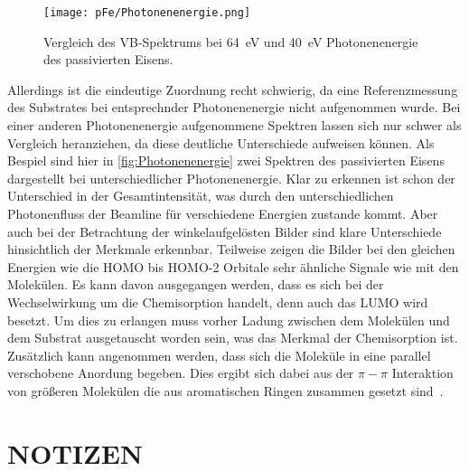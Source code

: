        \begin{figure}
            \centering
            \texttt{[image: pFe/Photonenenergie.png]}
            \caption{Vergleich des VB-Spektrums bei \SI{64}{\electronvolt} und \SI{40}{\electronvolt} Photonenenergie des passivierten Eisens.}
            \label{fig:Photonenenergie}
        \end{figure}

        Allerdings ist die eindeutige Zuordnung recht schwierig, da eine Referenzmessung des Substrates bei entsprechnder Photonenenergie nicht aufgenommen wurde.
        Bei einer anderen Photonenenergie aufgenommene Spektren lassen sich nur schwer als Vergleich heranziehen, da diese deutliche Unterschiede aufweisen können.
        Als Bespiel sind hier in \autoref{fig:Photonenenergie} zwei Spektren des passivierten Eisens dargestellt bei unterschiedlicher Photonenenergie.
        Klar zu erkennen ist schon der Unterschied in der Gesamtintensität, was durch den unterschiedlichen Photonenfluss der Beamline für verschiedene Energien zustande kommt.
        Aber auch bei der Betrachtung der winkelaufgelösten Bilder sind klare Unterschiede hinsichtlich der Merkmale erkennbar.
        Teilweise zeigen die Bilder bei den gleichen Energien wie die HOMO bis HOMO-2 Orbitale sehr ähnliche Signale wie mit den Molekülen.
        Es kann davon ausgegangen werden, dass es sich bei der Wechselwirkung um die Chemisorption handelt, denn auch das LUMO wird besetzt.
        Um dies zu erlangen muss vorher Ladung zwischen dem Molekülen und dem Substrat ausgetauscht worden sein, was das Merkmal der Chemisorption ist.
        Zusätzlich kann angenommen werden, dass sich die Moleküle in eine parallel verschobene Anordung begeben.
        Dies ergibt sich dabei aus der $\pi-\pi$ Interaktion von größeren Molekülen die aus aromatischen Ringen zusammen gesetzt sind~\cite{IF_13}.

  
    \section{NOTIZEN}
